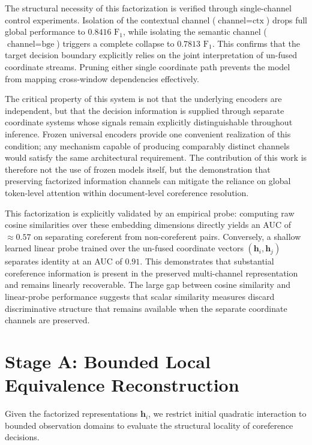 \documentclass[12pt]{article}
\begin{document}
	The structural necessity of this factorization is verified through single-channel control experiments. Isolation of the contextual channel ($\text{channel} = \text{ctx}$) drops full global performance to $0.8416$ $\text{F}_1$, while isolating the semantic channel ($\text{channel} = \text{bge}$) triggers a complete collapse to $0.7813$ $\text{F}_1$. This confirms that the target decision boundary explicitly relies on the joint interpretation of un-fused coordinate streams. Pruning either single coordinate path prevents the model from mapping cross-window dependencies effectively.
	
	The critical property of this system is not that the underlying encoders are independent, but that the decision information is supplied through separate coordinate systems whose signals remain explicitly distinguishable throughout inference. Frozen universal encoders provide one convenient realization of this condition; any mechanism capable of producing comparably distinct channels would satisfy the same architectural requirement. The contribution of this work is therefore not the use of frozen models itself, but the demonstration that preserving factorized information channels can mitigate the reliance on global token-level attention within document-level coreference resolution.
	
	This factorization is explicitly validated by an empirical probe: computing raw cosine similarities over these embedding dimensions directly yields an AUC of $\approx 0.57$ on separating coreferent from non-coreferent pairs. Conversely, a shallow learned linear probe trained over the un-fused coordinate vectors $(\mathbf{h}_i, \mathbf{h}_j)$ separates identity at an AUC of $0.91$. This demonstrates that substantial coreference information is present in the preserved multi-channel representation and remains linearly recoverable. The large gap between cosine similarity and linear-probe performance suggests that scalar similarity measures discard discriminative structure that remains available when the separate coordinate channels are preserved.
	
	\section{Stage A: Bounded Local Equivalence Reconstruction}\label{sec:stagea}
	Given the factorized representations $\mathbf{h}_i$, we restrict initial quadratic interaction to bounded observation domains to evaluate the structural locality of coreference decisions.
	
\end{document}
